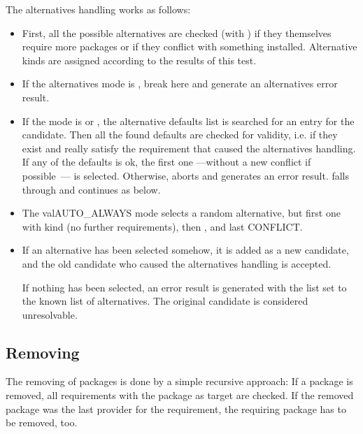 \documentclass[10pt]{article}
\begin{document}
The alternatives handling works as follows:
\begin{itemize}
\item
  First, all the possible alternatives are checked (with
  ) if they themselves require more packages or if
  they conflict with something installed. Alternative kinds are
  assigned according to the results of this test.

\item
  If the alternatives mode is , break here and
  generate an alternatives error result.

\item
  If the mode is  or ,
  the alternative defaults list is searched for an entry for the
  candidate. Then all the found defaults are checked for validity,
  i.e. if they exist and really satisfy the requirement that caused
  the alternatives handling. If any of the defaults is ok, the first
  one ---without a new conflict if possible~--- is selected.
  Otherwise,  aborts and generates an error
  result.  falls through and continues as
   below.

\item
  The val{AUTO_ALWAYS} mode selects a random alternative, but first
  one with kind  (no further requirements), then
  , and last {CONFLICT}.

\item
  If an alternative has been selected somehow, it is added as a new
  candidate, and the old candidate who caused the alternatives
  handling is accepted.

  If nothing has been selected, an error result is generated with the
   list set to the known list of alternatives. The
  original candidate is considered unresolvable.
\end{itemize}



\subsection{Removing}

The removing of packages is done by a simple recursive approach: If a
package is removed, all requirements with the package as target are
checked. If the removed package was the last provider for the
requirement, the requiring package has to be removed, too.
\end{document}
